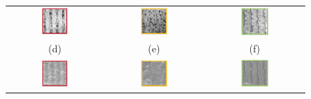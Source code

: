 \begin{figure}[H]
\begin{tabular}{ccc}
 \includegraphics[width=0.30\textwidth]{Bilder/TS4048/aSLELOcl2.png} &   \includegraphics[width=0.30\textwidth]{Bilder/TS4048/bSLELOcl2.png} & \includegraphics[width=0.30\textwidth]{Bilder/TS4048/cSLELOcl2.png}  \\
(d)  & (e) & (f)   \\[6pt]
\includegraphics[width=0.30\textwidth]{Bilder/TS4048/aSLELOcl1.png} & \includegraphics[width=0.30\textwidth]{Bilder/TS4048/bSLELOcl1.png}  & \includegraphics[width=0.30\textwidth]{Bilder/TS4048/cSLELOcl1.png} \\

\end{tabular}
\end{figure}
